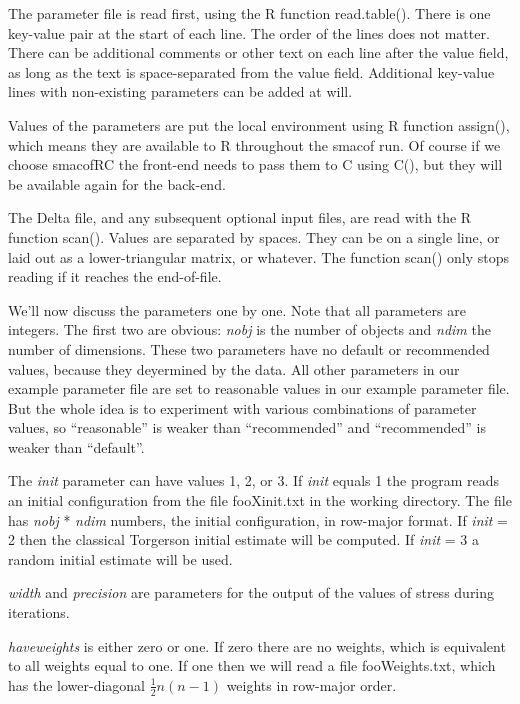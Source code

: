 \documentclass[
  12pt,
]{article}
\begin{document}
The parameter file is read first, using the R function read.table(). There is one
key-value pair at the start of each line. The order of the lines does not matter. There can be additional comments or other text on each line after the value field, as long as the text is space-separated from the value field. Additional key-value lines with non-existing
parameters can be added at will.

Values of the parameters are put the local environment using
R function assign(), which means they are available to R throughout the smacof run. Of course if we choose smacofRC the front-end needs to pass them to C using C(), but they will
be available again for the back-end.

The Delta file, and any subsequent optional input files, are read with the R function scan(). Values are separated by spaces. They can be on a single line, or laid out as a
lower-triangular matrix, or whatever. The function scan() only stops reading if it reaches the end-of-file.

We'll now discuss the parameters one by one. Note that all parameters are integers. The first two are obvious: \emph{nobj} is the number of objects and \emph{ndim} the number of dimensions.
These two parameters have no default or recommended values, because they deyermined by the data. All other parameters in our example parameter file are set to
reasonable values in our example parameter file. But the whole idea is to experiment
with various combinations of parameter values, so ``reasonable'' is weaker than
``recommended'' and ``recommended'' is weaker than ``default''.

The \emph{init} parameter can have values 1, 2, or 3.
If \emph{init} equals 1 the program reads an initial configuration from the file fooXinit.txt in the
working directory. The file has \emph{nobj} * \emph{ndim} numbers, the initial
configuration, in row-major format. If \emph{init} = 2 then the classical Torgerson initial estimate will be computed. If \emph{init} = 3 a random initial estimate will be used.

\emph{width} and \emph{precision} are parameters for the output of the values of stress during
iterations.

\emph{haveweights} is either zero or one. If zero there are no weights, which is equivalent to all weights equal to one. If one then we will read a file fooWeights.txt, which has the
lower-diagonal \(\frac12 n(n-1)\) weights in row-major order.
\end{document}
